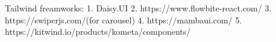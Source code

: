 Tailwind freamworks:
1. Daisy.UI
2. https://www.flowbite-react.com/
3. https://swiperjs.com/(for carousel)
4. https://mambaui.com/
5. https://kitwind.io/products/kometa/components/
